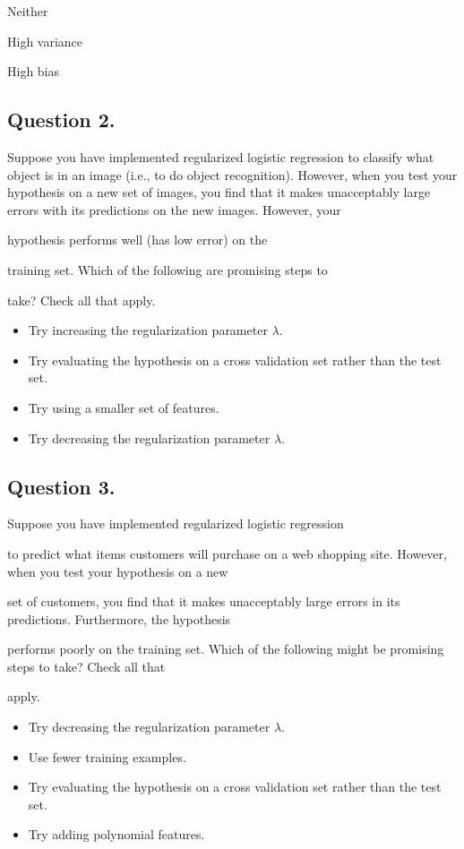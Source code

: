\documentclass[11pt]{article} %
\begin{document}
Neither

High variance

High bias
\subsection*{Question 2. }
Suppose you have implemented regularized logistic regression  to classify what object is in an image (i.e., to do object recognition). However, when you test your hypothesis on a new set of images, you find that it makes unacceptably large 
errors with its predictions on the new images. However, your

hypothesis performs well (has low error) on the

training set. Which of the following are promising steps to

take? Check all that apply.

\begin{itemize}
\item 
Try increasing the regularization parameter $\lambda$.
\item 
Try evaluating the hypothesis on a cross validation set rather than the test set.
\item 
Try using a smaller set of features.
\item 
Try decreasing the regularization parameter $\lambda$.
\end{itemize}
\subsection*{Question 3. }
Suppose you have implemented regularized logistic regression

to predict what items customers will purchase on a web shopping site. However, when you test your hypothesis on a new

set of customers, you find that it makes unacceptably large errors in its predictions. Furthermore, the hypothesis

performs poorly on the training set. Which of the following might be promising steps to take? Check all that

apply.

\begin{itemize}
\item Try decreasing the regularization parameter $\lambda$.

\item Use fewer training examples.

\item Try evaluating the hypothesis on a cross validation set rather than the test set.

\item Try adding polynomial features.
\end{itemize}
\end{document}
